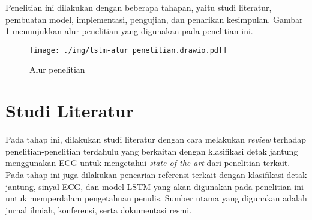 



Penelitian ini dilakukan dengan beberapa tahapan, yaitu studi literatur, pembuatan model, implementasi, pengujian, dan penarikan kesimpulan. Gambar \ref{fig:alur-penelitian} menunjukkan alur penelitian yang digunakan pada penelitian ini.

\begin{figure}[tph]
	\centering
	\texttt{[image: ./img/lstm-alur penelitian.drawio.pdf]}
	\caption{Alur penelitian}
	\label{fig:alur-penelitian}
\end{figure}

\section{Studi Literatur}
\label{subsec: metodologi-studi-literatur}

Pada tahap ini, dilakukan studi literatur dengan cara melakukan \textit{review}
terhadap penelitian-penelitian terdahulu yang berkaitan dengan klasifikasi detak jantung menggunakan ECG
untuk mengetahui \textit{state-of-the-art} dari penelitian terkait.
Pada tahap ini juga dilakukan pencarian referensi terkait dengan klasifikasi detak jantung,
sinyal ECG, dan model LSTM yang akan digunakan pada penelitian ini untuk memperdalam pengetahuan penulis.
Sumber utama yang digunakan adalah jurnal ilmiah, konferensi, serta dokumentasi resmi.


